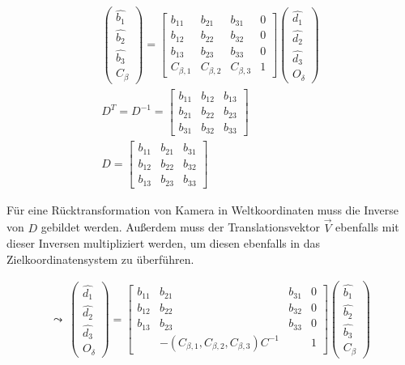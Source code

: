 	\begin{gather}
	\begin{pmatrix}
	\hat{b_1}\\
	\hat{b_2}\\
	\hat{b_3}\\
	C_\beta
	\end{pmatrix} = 
	\begin{bmatrix}
	b_{11} & b_{21} & b_{31} & 0\\
	b_{12} & b_{22} & b_{32} & 0\\
	b_{13} & b_{23} & b_{33} & 0\\
	C_{\beta,1} & C_{\beta,2} & C_{\beta,3} & 1
	\end{bmatrix}
	\begin{pmatrix}
	\hat{d_1}\\
	\hat{d_2}\\
	\hat{d_3}\\
	O_\delta
	\end{pmatrix}\\
	D^T = D^{-1}= \begin{bmatrix}
	b_{11} & b_{12} & b_{13} \\
	b_{21} & b_{22} & b_{23} \\
	b_{31} & b_{32} & b_{33} 
	\end{bmatrix}\\
	D = \begin{bmatrix}
	b_{11} & b_{21} & b_{31} \\
	b_{12} & b_{22} & b_{32} \\
	b_{13} & b_{23} & b_{33} 
	\end{bmatrix}
	\end{gather}

Für eine Rücktransformation von Kamera in Weltkoordinaten muss die Inverse von $D$ gebildet werden.
Außerdem muss der Translationsvektor $\vec{V}$ ebenfalls mit dieser Inversen multipliziert werden, um diesen ebenfalls in das Zielkoordinatensystem zu überführen.
	
	
	\begin{gather}
	\leadsto \: \begin{pmatrix}
	\hat{d_1}\\
	\hat{d_2}\\
	\hat{d_3}\\
	O_\delta
	\end{pmatrix} = 
	\begin{bmatrix}
	b_{11} & b_{21} & b_{31} & 0\\
	b_{12} & b_{22} & b_{32} & 0\\
	b_{13} & b_{23} & b_{33} & 0\\
	&-(	C_{\beta,1}, C_{\beta,2}, C_{\beta,3})C^{-1}& & 1
	\end{bmatrix}
	\begin{pmatrix}
	\hat{b_1}\\
	\hat{b_2}\\
	\hat{b_3}\\
	C_\beta
	\end{pmatrix}
	\end{gather}
	

